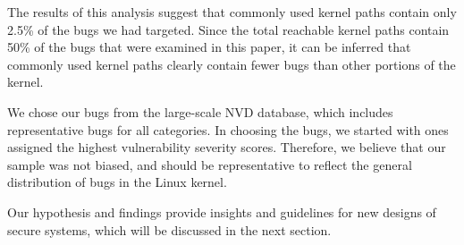 The results of this analysis suggest that commonly used kernel paths contain only
2.5\% of the bugs we had targeted.
Since the total reachable kernel paths contain 50\% of the bugs that were
examined in this paper,
it can be inferred that commonly used kernel paths clearly contain fewer bugs
than other portions of the kernel.

We chose our bugs from the large-scale NVD database, which includes representative
bugs for all categories. In choosing the bugs, we
started with ones assigned the highest vulnerability severity scores.
Therefore, we believe that our sample was not biased, and should be representative
to reflect the general distribution of bugs in the Linux kernel. 

Our hypothesis and findings provide insights and guidelines for new designs
of secure systems,
which will be discussed in the next section.

